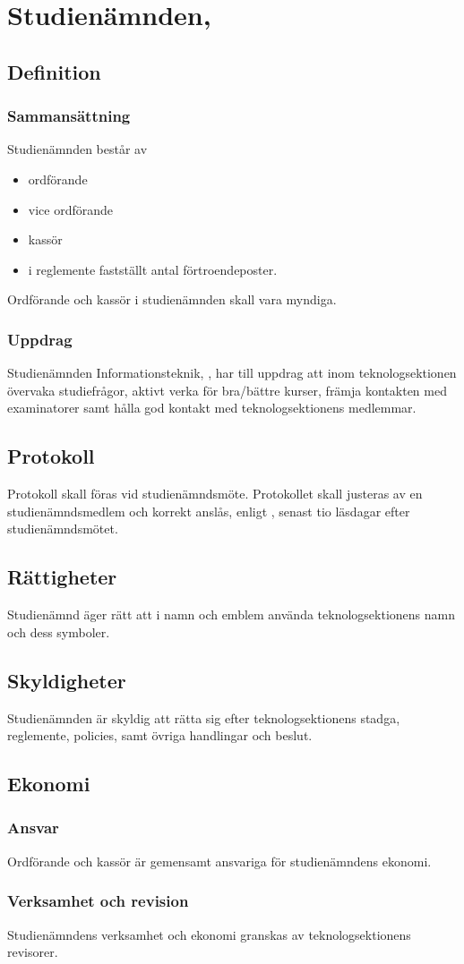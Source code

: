 \section{Studienämnden, \SNIT}

\subsection{Definition}

\subsubsection{Sammansättning}
Studienämnden består av 
\begin{itemize}
    \item ordförande
    \item vice ordförande
    \item kassör
    \item i reglemente fastställt antal förtroendeposter.
\end{itemize}

Ordförande och kassör i studienämnden skall vara myndiga.

\subsubsection{Uppdrag}
Studienämnden Informationsteknik, \SNIT{}, har till uppdrag att inom teknologsektionen övervaka studiefrågor, aktivt verka för bra/bättre kurser, främja kontakten med examinatorer samt hålla god kontakt med teknologsektionens medlemmar.

\subsection{Protokoll}
Protokoll skall föras vid studienämndsmöte. Protokollet skall justeras av en studienämndsmedlem och korrekt anslås, enligt , senast tio läsdagar efter studienämndsmötet.

\subsection{Rättigheter}
Studienämnd äger rätt att i namn och emblem använda teknologsektionens namn och dess symboler.

\subsection{Skyldigheter}
Studienämnden är skyldig att rätta sig efter teknologsektionens stadga, reglemente, policies, samt övriga handlingar och beslut.

\subsection{Ekonomi}
\subsubsection{Ansvar}
Ordförande och kassör är gemensamt ansvariga för studienämndens ekonomi.
\subsubsection{Verksamhet och revision}
Studienämndens verksamhet och ekonomi granskas av teknologsektionens revisorer.